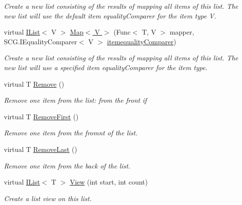 \begin{DoxyCompactItemize}
\begin{DoxyCompactList}\small\item\em Create a new list consisting of the results of mapping all items of this list. The new list will use the default item equality\+Comparer for the item type V. \end{DoxyCompactList}\item 
virtual \hyperlink{interface_c5_1_1_i_list}{I\+List}$<$ V $>$ \hyperlink{class_c5_1_1_array_list_a3cc88a23901441ffca7b03f8445c6c6a}{Map$<$ V $>$} (Func$<$ T, V $>$ mapper, S\+C\+G.\+I\+Equality\+Comparer$<$ V $>$ \hyperlink{class_c5_1_1_collection_base_a95e343400be0e8f3f8d6310f1aaf2cc6}{itemequality\+Comparer})
\begin{DoxyCompactList}\small\item\em Create a new list consisting of the results of mapping all items of this list. The new list will use a specified item equality\+Comparer for the item type. \end{DoxyCompactList}\item 
virtual T \hyperlink{class_c5_1_1_array_list_a0bdb83e1cd5d4e6a75440f75c0fa7c9b}{Remove} ()
\begin{DoxyCompactList}\small\item\em Remove one item from the list\+: from the front if \end{DoxyCompactList}\item 
virtual T \hyperlink{class_c5_1_1_array_list_aaf9d886025d96e91a9275055a37b984f}{Remove\+First} ()
\begin{DoxyCompactList}\small\item\em Remove one item from the fromnt of the list. \end{DoxyCompactList}\item 
virtual T \hyperlink{class_c5_1_1_array_list_af26267e25450db0612a4eeb8210560c5}{Remove\+Last} ()
\begin{DoxyCompactList}\small\item\em Remove one item from the back of the list. \end{DoxyCompactList}\item 
virtual \hyperlink{interface_c5_1_1_i_list}{I\+List}$<$ T $>$ \hyperlink{class_c5_1_1_array_list_a07ada18bdafce7fc420fcd54f4da17c9}{View} (int start, int count)
\begin{DoxyCompactList}\small\item\em Create a list view on this list. \end{DoxyCompactList}\item 

\end{DoxyCompactItemize}

